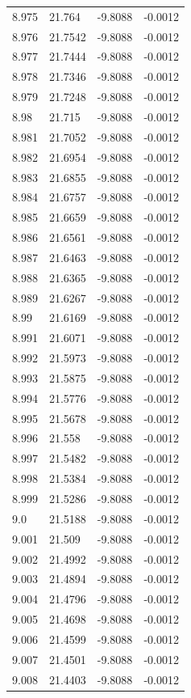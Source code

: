 \begin{tabular}{llll}
8.975 & 21.764 & -9.8088 & -0.0012 \\
8.976 & 21.7542 & -9.8088 & -0.0012 \\
8.977 & 21.7444 & -9.8088 & -0.0012 \\
8.978 & 21.7346 & -9.8088 & -0.0012 \\
8.979 & 21.7248 & -9.8088 & -0.0012 \\
8.98 & 21.715 & -9.8088 & -0.0012 \\
8.981 & 21.7052 & -9.8088 & -0.0012 \\
8.982 & 21.6954 & -9.8088 & -0.0012 \\
8.983 & 21.6855 & -9.8088 & -0.0012 \\
8.984 & 21.6757 & -9.8088 & -0.0012 \\
8.985 & 21.6659 & -9.8088 & -0.0012 \\
8.986 & 21.6561 & -9.8088 & -0.0012 \\
8.987 & 21.6463 & -9.8088 & -0.0012 \\
8.988 & 21.6365 & -9.8088 & -0.0012 \\
8.989 & 21.6267 & -9.8088 & -0.0012 \\
8.99 & 21.6169 & -9.8088 & -0.0012 \\
8.991 & 21.6071 & -9.8088 & -0.0012 \\
8.992 & 21.5973 & -9.8088 & -0.0012 \\
8.993 & 21.5875 & -9.8088 & -0.0012 \\
8.994 & 21.5776 & -9.8088 & -0.0012 \\
8.995 & 21.5678 & -9.8088 & -0.0012 \\
8.996 & 21.558 & -9.8088 & -0.0012 \\
8.997 & 21.5482 & -9.8088 & -0.0012 \\
8.998 & 21.5384 & -9.8088 & -0.0012 \\
8.999 & 21.5286 & -9.8088 & -0.0012 \\
9.0 & 21.5188 & -9.8088 & -0.0012 \\
9.001 & 21.509 & -9.8088 & -0.0012 \\
9.002 & 21.4992 & -9.8088 & -0.0012 \\
9.003 & 21.4894 & -9.8088 & -0.0012 \\
9.004 & 21.4796 & -9.8088 & -0.0012 \\
9.005 & 21.4698 & -9.8088 & -0.0012 \\
9.006 & 21.4599 & -9.8088 & -0.0012 \\
9.007 & 21.4501 & -9.8088 & -0.0012 \\
9.008 & 21.4403 & -9.8088 & -0.0012 \\

\end{tabular}
